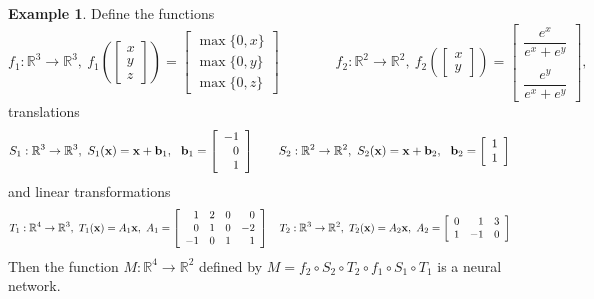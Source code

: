 \documentclass[12pt]{amsart}
\newcommand{\R}{\mathbb{R}}
\theoremstyle{definition}
\newtheorem*{example}{Example}
\begin{document}
\begin{example}
    Define the functions
    \[
        f_1:\R^3\to \R^3, ~ f_1\left(\left[\begin{array}{c} x \\ y \\ z \end{array}\right]\right)=\left[\begin{array}{c} \max\{0,x\} \\ \max\{0,y\} \\ \max\{0,z\} \end{array}\right]
        \qquad\qquad
        f_2:\R^2\to\R^2, ~ f_2\left(\left[\begin{array}{c} x \\ y \end{array}\right]\right)= \left[\begin{array}{c} \dfrac{e^x}{e^x+e^y} \\ ~ \\ \dfrac{e^y}{e^x+e^y} \end{array}\right],
    \]
    translations
    \[
        S_1:\R^3\to\R^3, ~ S_1({\bf x}) = {\bf x} + {\bf b}_1, ~~ {\bf b}_1 = \left[\begin{array}{r} -1 \\ 0 \\ 1 \end{array}\right]
        \qquad
        S_2:\R^2\to\R^2, ~ S_2({\bf x}) = {\bf x} + {\bf b}_2, ~~ {\bf b}_2 = \left[\begin{array}{r} 1 \\ 1 \end{array}\right]
    \]
    and linear transformations
    \[
        T_1:\R^4\to\R^3, ~ T_1({\bf x}) = A_1{\bf x}, 
            ~ A_1=\left[\begin{array}{rrrr}
                1 & 2 & 0 & 0 \\
                0 & 1 & 0 & -2 \\
                -1 & 0 & 1 & 1
            \end{array}\right]
        \quad
        T_2:\R^3\to\R^2, ~ T_2({\bf x}) = A_2{\bf x}, 
            ~ A_2=\left[\begin{array}{rrr}
                0 & 1 & 3 \\
                1 & -1 & 0 
            \end{array}\right]
    \]
    Then the function $M:\R^4\to \R^2$ defined by $M=f_2\circ S_2 \circ T_2 \circ f_1 \circ S_1 \circ T_1$ is a neural network.
\end{example}
\end{document}
